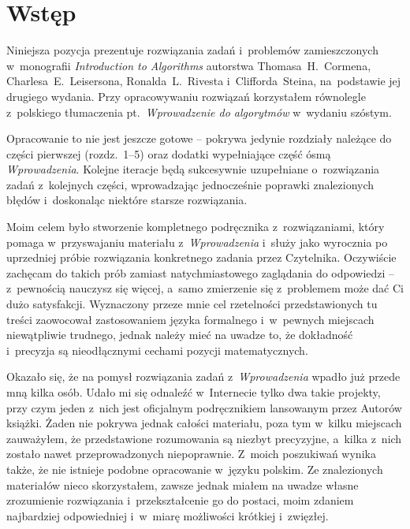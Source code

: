\chapter{Wstęp}

Niniejsza pozycja prezentuje rozwiązania zadań i~problemów zamieszczonych w~monografii \textsl{Introduction to Algorithms} \cite{cormen} autorstwa Thomasa~H.~Cormena, Charlesa~E.~Leisersona, Ronalda~L.~Rivesta i~Clifforda~Steina, na~podstawie jej drugiego wydania. Przy opracowywaniu rozwiązań korzystałem równolegle z~polskiego tłumaczenia pt.~\textsl{Wprowadzenie do algorytmów} \cite{cormenpl} w~wydaniu szóstym.

Opracowanie to nie jest jeszcze gotowe -- pokrywa jedynie rozdziały należące do części pierwszej (rozdz.~1\nobreakdash--5)
oraz dodatki wypełniające część ósmą \textsl{Wprowadzenia}. Kolejne iteracje będą sukcesywnie uzupełniane o~rozwiązania zadań z~kolejnych części, wprowadzając jednocześnie poprawki znalezionych błędów i~doskonaląc niektóre starsze rozwiązania.

Moim celem było stworzenie kompletnego podręcznika z~rozwiązaniami, który pomaga w~przyswajaniu materiału z~\textsl{Wprowadzenia} i~służy jako wyrocznia po uprzedniej próbie rozwiązania konkretnego zadania przez Czytelnika. Oczywiście zachęcam do takich prób zamiast natychmiastowego zaglądania do odpowiedzi -- z~pewnością nauczysz się więcej, a~samo zmierzenie się z~problemem może dać Ci dużo satysfakcji. Wyznaczony przeze mnie cel rzetelności przedstawionych tu treści zaowocował zastosowaniem języka formalnego i~w~pewnych miejscach niewątpliwie trudnego, jednak należy mieć na uwadze to, że dokładność i~precyzja są nieodłącznymi cechami pozycji matematycznych.

Okazało się, że na pomysł rozwiązania zadań z~\textsl{Wprowadzenia} wpadło już przede mną kilka osób. Udało mi się odnaleźć w~Internecie tylko dwa takie projekty, przy czym jeden z~nich jest oficjalnym podręcznikiem lansowanym przez Autorów książki. Żaden nie pokrywa jednak całości materiału, poza tym w~kilku miejscach zauważyłem, że przedstawione rozumowania są niezbyt precyzyjne, a~kilka z~nich zostało nawet przeprowadzonych niepoprawnie. Z~moich poszukiwań wynika także, że nie istnieje podobne opracowanie w~języku polskim. Ze znalezionych materiałów nieco skorzystałem, zawsze jednak miałem na uwadze własne zrozumienie rozwiązania i~przekształcenie go do postaci, moim zdaniem najbardziej odpowiedniej i~w~miarę możliwości krótkiej i~zwięzłej.

